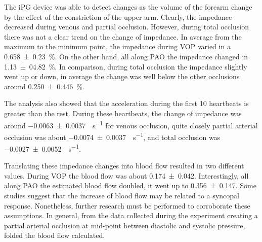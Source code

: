 \label{section occlusion 3}
The iPG device was able to detect changes as the volume of the forearm change by the effect of the constriction of the upper arm. Clearly, the impedance decreased during venous and partial occlusion. However, during total occlusion there was not a clear trend on the change of impedance. In average from the maximum to the minimum point, the impedance during VOP varied in a \SI{0.658(0230)}{\percent}. On the other hand, all along PAO the impedance changed in \SI{1.13(0482)}{\percent}. In comparison, during total occlusion the impedance slightly went up or down, in average the change was well below the other occlusions around \SI{0.250(0446)}{\percent}. 

The analysis also showed that the acceleration during the first 10 heartbeats is greater than the rest. During these heartbeats, the change of impedance was around \SI{-0.0063(00037)}{\Omega \per \second} for venous occlusion, quite closely partial arterial occlusion was about \SI{-0.0074(00037)}{\Omega \per \second}, and total occlusion was \SI{-0.0027(00052)}{\Omega \per \second}. 

Translating these impedance changes into blood flow resulted in two different values. During VOP the blood flow was about \SI{0.174(0042)}{\bfv}. Interestingly, all along PAO the estimated blood flow doubled, it went up to \SI{0.356(0147)}{\bfv}. Some studies \cite{joyner2001belfast, hainsworth2003syncope} suggest that the increase of blood flow may be related to a syncopal response. Nonetheless, further research must be performed to corroborate these assumptions.  In general, from the data collected during the experiment creating a partial arterial occlusion at mid-point between diastolic and systolic pressure, folded the blood flow calculated. 

